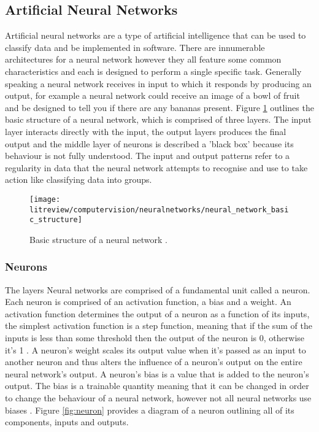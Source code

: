 \subsection{Artificial Neural Networks}

Artificial neural networks are a type of artificial intelligence that can be used to classify data and be implemented in software. There are innumerable architectures for a neural network however they all feature some common characteristics and each is designed to perform a single specific task. Generally speaking a neural network receives in input to which it responds by producing an output, for example a neural network could receive an image of a bowl of fruit and be designed to tell you if there are any bananas present. Figure \ref{fig:neural_network} outlines the basic structure of a neural network, which is comprised of three layers. The input layer interacts directly with the input, the output layers produces the final output and the middle layer of neurons is described a 'black box' because its behaviour is not fully understood. The input and output patterns refer to a regularity in data that the neural network attempts to recognise and use to take action like classifying data into groups\cite{statistical_pattern_recognition}. 


\begin{figure}[ht]
    \centering
    \texttt{[image: litreview/computervision/neuralnetworks/neural\_network\_basic\_structure]}
    \caption{Basic structure of a neural network \cite{neural_networks}.}
    \label{fig:neural_network}
\end{figure}

\subsubsection{Neurons}

The layers Neural networks are comprised of a fundamental unit called a neuron. Each neuron is comprised of an activation function, a bias and a weight. An activation function determines the output of a neuron as a function of its inputs, the simplest activation function is a step function, meaning that if the sum of the inputs is less than some threshold then the output of the neuron is 0, otherwise it's 1 \cite{machine_learning_dictionary}. A neuron's weight scales its output value when it's passed as an input to another neuron and thus alters the influence of a neuron's output on the entire neural network's output. A neuron's bias is a value that is added to the neuron's output. The bias is a trainable quantity meaning that it can be changed in order to change the behaviour of a neural network, however not all neural networks use biases \cite{neural_networks}. Figure \ref{fig:neuron} provides a diagram of a neuron outlining all of its components, inputs and outputs. 


